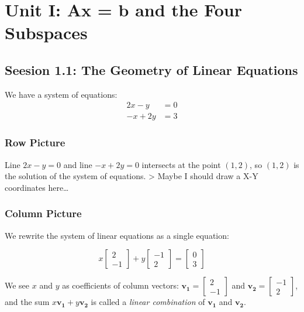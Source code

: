 \documentclass[]{article}
\date{}
\begin{document}
\hypertarget{unit-i-ax-b-and-the-four-subspaces}{%
\section{Unit I: Ax = b and the Four
Subspaces}\label{unit-i-ax-b-and-the-four-subspaces}}

\hypertarget{seesion-1.1-the-geometry-of-linear-equations}{%
\subsection{Seesion 1.1: The Geometry of Linear
Equations}\label{seesion-1.1-the-geometry-of-linear-equations}}

We have a system of equations: \[
\begin{aligned}
2x - y &= 0 \\
-x + 2y &= 3
\end{aligned}
\]

\hypertarget{row-picture}{%
\subsubsection{Row Picture}\label{row-picture}}

Line \(2x - y = 0\) and line \(-x + 2y = 0\) intersects at the point
\((1, 2)\), so \((1, 2)\) is the solution of the system of equations.
\textgreater{} Maybe I should draw a X-Y coordinates here\ldots{}

\hypertarget{column-picture}{%
\subsubsection{Column Picture}\label{column-picture}}

We rewrite the system of linear equations as a single equation:

\[
x\begin{bmatrix}2 \\-1\end{bmatrix} + y\begin{bmatrix}-1 \\2\end{bmatrix} = \begin{bmatrix}0 \\3\end{bmatrix}
\]

We see \(x\) and \(y\) as coefficients of column vectors:
\(\boldsymbol{v_1} = \begin{bmatrix}2 \\ -1\end{bmatrix}\) and
\(\boldsymbol{v_2} = \begin{bmatrix}-1 \\ 2\end{bmatrix}\), and the sum
\(x\boldsymbol{v_1} + y\boldsymbol{v_2}\) is called a \emph{linear
combination} of \(\boldsymbol{v_1}\) and \(\boldsymbol{v_2}\).
\end{document}
